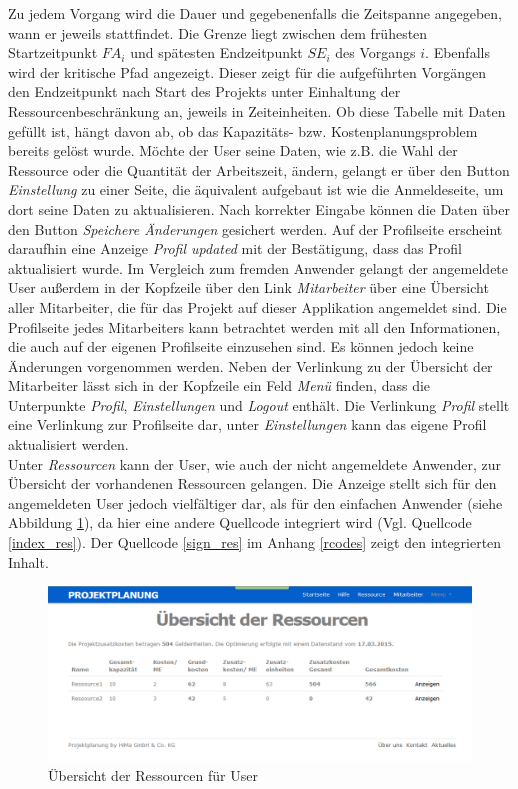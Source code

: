\documentclass[a4paper,12pt,parskip,bibtotoc,liststotoc]{article}
\begin{document}
Zu jedem Vorgang wird die Dauer und gegebenenfalls die Zeitspanne angegeben, wann er jeweils stattfindet. Die Grenze liegt zwischen dem frühesten Startzeitpunkt $FA_{i}$ und spätesten Endzeitpunkt $SE_{i}$ des Vorgangs $i$. Ebenfalls wird der kritische Pfad angezeigt. Dieser zeigt für die aufgeführten Vorgängen den Endzeitpunkt nach Start des Projekts unter Einhaltung der Ressourcenbeschränkung an, jeweils in Zeiteinheiten. Ob diese Tabelle mit Daten gefüllt ist, hängt davon ab, ob das Kapazitäts- bzw. Kostenplanungsproblem bereits gelöst wurde. Möchte der User seine Daten, wie z.B. die Wahl der Ressource oder die Quantität der Arbeitszeit, ändern, gelangt er über den Button \textit{Einstellung} zu einer Seite, die äquivalent aufgebaut ist wie die Anmeldeseite, um dort seine Daten zu aktualisieren. Nach korrekter Eingabe können die Daten über den Button \textit{Speichere Änderungen} gesichert werden. Auf der Profilseite erscheint daraufhin eine Anzeige \textit{Profil updated} mit der Bestätigung, dass das Profil aktualisiert wurde. Im Vergleich zum fremden Anwender gelangt der angemeldete User außerdem in der Kopfzeile über den Link \textit{Mitarbeiter} über eine Übersicht aller Mitarbeiter, die für das Projekt auf dieser Applikation angemeldet sind. Die Profilseite jedes Mitarbeiters kann betrachtet werden mit all den Informationen, die auch auf der eigenen Profilseite einzusehen sind. Es können jedoch keine Änderungen vorgenommen werden. Neben der Verlinkung zu der Übersicht der Mitarbeiter lässt sich in der Kopfzeile ein Feld \textit{Menü} finden, dass die Unterpunkte \textit{Profil}, \textit{Einstellungen} und \textit{Logout} enthält. Die Verlinkung \textit{Profil} stellt eine Verlinkung zur Profilseite dar, unter \textit{Einstellungen} kann das eigene Profil aktualisiert werden.\\

Unter \textit{Ressourcen} kann der User, wie auch der nicht angemeldete Anwender, zur Übersicht der vorhandenen Ressourcen gelangen. Die Anzeige stellt sich für den angemeldeten User jedoch vielfältiger dar, als für den einfachen Anwender (siehe Abbildung \ref{ResUs}), da hier eine andere Quellcode integriert wird (Vgl. Quellcode \ref{index_res}). Der Quellcode \ref{sign_res} im Anhang \ref{rcodes} zeigt den integrierten Inhalt.\\

\begin{figure}[h!]
  \begin{center}
    \includegraphics[width=120mm]{Bilder/Ressourcen_User.png}
    \caption{Übersicht der Ressourcen für User}  \label{ResUs}
  \end{center}
\end{figure}
\end{document}
